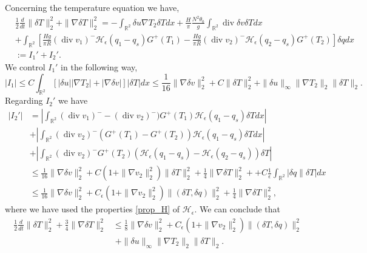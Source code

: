 \documentclass[11pt, a4paper, article,reqno,]{amsart}
\theoremstyle{remark}
\DeclareMathOperator{\dive}{div}
\numberwithin{equation}{section}
\begin{document}
Concerning the temperature equation we have,
\begin{equation*}
    \begin{aligned}
        & \frac{1}{2}\frac{d}{dt} \|\delta T\|_2^2+ \|\nabla \delta T\|_2^2 = - \int_{\mathbb{R}^2} \delta u \nabla T_2 \delta T dx + \frac{H}{\pi}\frac{N^2 \theta_0}{g}\int_{\mathbb{R}^2} \dive \delta v \delta T dx \\
        & + \int_{\mathbb{R}^2} \left[ \frac{H g}{\pi R}(\dive v_1)^-\mathcal{H}_\epsilon(q_1-q_s) G^+(T_1) - \frac{H g}{\pi R}(\dive v_2)^- \mathcal{H}_\epsilon(q_2-q_s) G^+(T_2) \right] \delta qdx \\
        & := I_1' +I_2'.
    \end{aligned}
\end{equation*}
We control $I_1'$ in the following way,
\begin{equation*}
    |I_1| \leq C \int_{\mathbb{R}^2} [|\delta u| |\nabla T_2| + |\nabla \delta v|]|\delta T | dx \leq \frac{1}{16} \|\nabla \delta v\|_2^2 + C\|\delta T\|_2^2 + \|\delta u\|_\infty \|\nabla T_2\|_2 \|\delta T\|_2.
\end{equation*}
Regarding $I_2'$ we have
\begin{equation*}
    \begin{aligned}
        |I_2'| &= \left|\int_{\mathbb{R}^2}(\dive v_1)^- - (\dive v_2)^-)G^+(T_1) \mathcal{H_\epsilon}(q_1-q_s) \delta T dx\right| \\
        & + \left|\int_{\mathbb{R}^2}(\dive v_2)^- (G^+(T_1)-G^+(T_2))\mathcal{H}_\epsilon(q_1-q_s) \delta T dx\right| \\
        & + \left|\int_{\mathbb{R}^2} (\dive v_2)^- G^+(T_2)(\mathcal{H}_\epsilon(q_1 -q_s) - \mathcal{H}_\epsilon(q_2 -q_s))\delta T\right|\\
        & \leq \frac{1}{16} \|\nabla \delta v\|_2^2 + C( 1 + \|\nabla v_2\|_2^2)\|\delta T\|_2^2 + \frac{1}{4}\|\nabla \delta T\|_2^2 + + C\frac{1}{\epsilon}\int_{\mathbb{R}^2}|\delta q\|\delta T|dx \\
        & \leq \frac{1}{16} \|\nabla \delta v\|_2^2 + C_\epsilon( 1 + \|\nabla v_2\|_2^2)\|(\delta T, \delta q)\|_2^2 + \frac{1}{4}\|\nabla \delta T\|_2^2 ,
    \end{aligned}
\end{equation*}
where we have used the properties \eqref{prop_H} of $\mathcal{H_\epsilon}$. We can conclude that
\begin{equation}\label{pt_1_2}
    \begin{aligned}
        \frac{1}{2}\frac{d}{dt} \|\delta T\|_2^2+ \frac{3}{4}\|\nabla \delta T\|_2^2 & \leq \frac{1}{8} \|\nabla \delta v\|_2^2 + C_\epsilon( 1 + \|\nabla v_2\|_2^2)\|(\delta T, \delta q)\|_2^2 \\
        & \; + \|\delta u\|_\infty \|\nabla T_2\|_2 \|\delta T\|_2.
    \end{aligned}
\end{equation}
\end{document}
